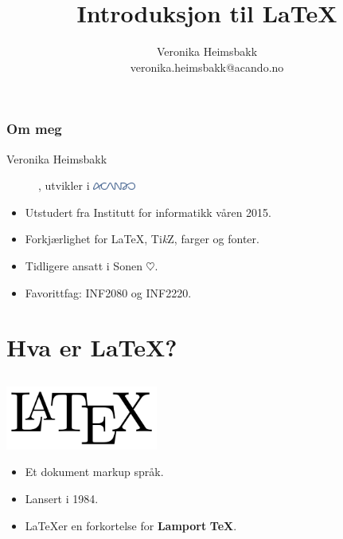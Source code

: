 \documentclass[10pt]{beamer}
\title{Introduksjon til \LaTeX{}}
\author{Veronika Heimsbakk\\veronika.heimsbakk@acando.no}
\date{}
\begin{document}
\begin{frame}\frametitle{}
\maketitle
\end{frame}

\begin{frame}\frametitle{Om meg}
\begin{description}
\item[Veronika Heimsbakk], utvikler i \includegraphics[width=1.4cm]{img/acandologo.png}
\end{description}

\begin{itemize}
	\item
	Utstudert fra Institutt for informatikk våren 2015.
	\item
	Forkjærlighet for \LaTeX{}, Ti\textit{k}Z, farger og fonter.
	\item
	Tidligere ansatt i Sonen $\heartsuit$.
	\item
	Favorittfag: INF2080 og INF2220.
\end{itemize}
\end{frame}

\section{Hva er \LaTeX{}?}
\subsection{}
\begin{frame}\frametitle{}

\begin{center}
\includegraphics[width=5cm]{img/latexlogo.png}
\end{center}

\begin{itemize}
	\item
	Et dokument markup språk.
	\item
	Lansert i 1984.
	\item
	\LaTeX er en forkortelse for \textbf{Lamport} \textbf{\TeX}.
\end{itemize}
\end{frame}
\end{document}
